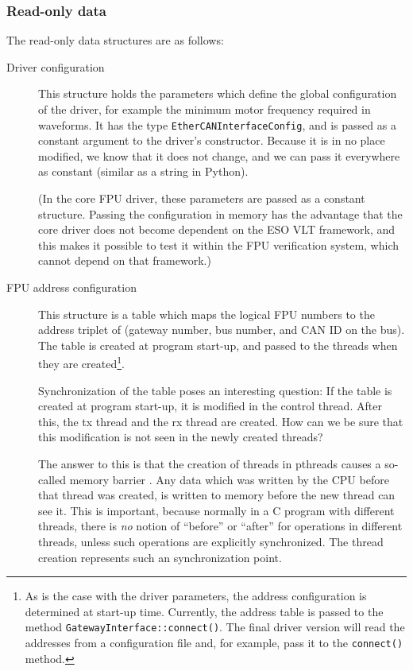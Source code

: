 \documentclass[fontsize=12,a4paper]{scrartcl}
\begin{document}
\subsubsection{Read-only data}

The read-only data structures are as follows:

\begin{description}
\item[Driver configuration] This structure holds the parameters which
  define the global configuration of the driver, for example the
  minimum motor frequency required in waveforms. It has the type
  \texttt{EtherCANInterfaceConfig}, and is passed as a constant
  argument to the driver's constructor. Because it is in no place
  modified, we know that it does not change, and we can pass it
  everywhere as constant (similar as a string in Python).

  (In the core FPU driver, these parameters are passed as a constant
  structure. Passing the configuration in memory has the advantage
  that the core driver does not become dependent on the ESO VLT
  framework, and this makes it possible to test it within the FPU
  verification system, which cannot depend on that framework.)

\item[FPU address configuration] This structure is a table which maps
  the logical FPU numbers to the address triplet of (gateway number,
  bus number, and CAN ID on the bus). The table is created at program
  start-up, and passed to the threads when they are created\footnote{
    As is the case with the driver parameters, the address
    configuration is determined at start-up time. Currently, the
    address table is passed to the method
    \texttt{GatewayInterface::connect()}. The final driver version
    will read the addresses from a configuration file and, for
    example, pass it to the \texttt{connect()} method.}.

  Synchronization of the table poses an interesting question: If the
  table is created at program start-up, it is modified in the control
  thread. After this, the tx thread and the rx thread are created. How
  can we be sure that this modification is not seen in the newly
  created threads?

  The answer to this is that the creation of threads in pthreads
  causes a so-called memory barrier
  \cite{WP:MemoryBarrier}\cite{Preshing:2012:MemoryBarriers}.  Any
  data which was written by the CPU before that thread was created, is
  written to memory before the new thread can see it. This is
  important, because normally in a C program with different threads,
  there is \emph{no} notion of ``before'' or ``after'' for operations
  in different threads, unless such operations are explicitly
  synchronized. The thread creation represents such an synchronization
  point.



\end{description}
\end{document}
